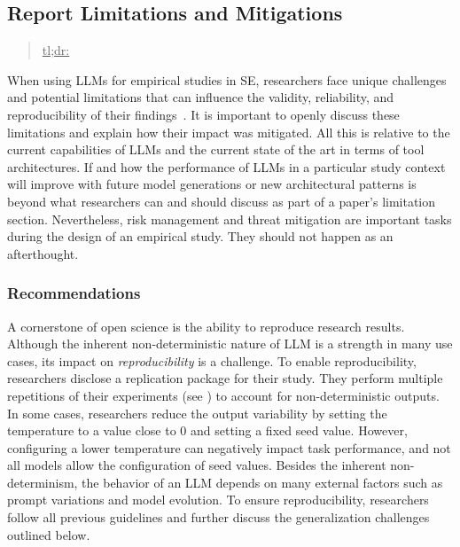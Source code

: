 



\subsection{Report Limitations and Mitigations}
\label{sec:report-limitations-and-mitigations}

\begin{quote}
\underline{tl;dr:} 
\end{quote}


When using LLMs for empirical studies in SE, researchers face unique challenges and potential limitations that can influence the validity, reliability, and reproducibility of their findings~\cite{sallou2024breaking}.
It is important to openly discuss these limitations and explain how their impact was mitigated.
All this is relative to the current capabilities of LLMs and the current state of the art in terms of tool architectures.
If and how the performance of LLMs in a particular study context will improve with future model generations or new architectural patterns is beyond what researchers can and should discuss as part of a paper's limitation section.
Nevertheless, risk management and threat mitigation are important tasks during the design of an empirical study.
They should not happen as an afterthought.

\subsubsection{Recommendations}

A cornerstone of open science is the ability to reproduce research results.
Although the inherent non-deterministic nature of LLM is a strength in many use cases, its impact on \emph{reproducibility} is a challenge.
To enable reproducibility, researchers \should disclose a replication package for their study.
They \should perform multiple repetitions of their experiments (see \benchmarksmetrics) to account for non-deterministic outputs.
In some cases, researchers \may reduce the output variability by setting the temperature to a value close to 0 and setting a fixed seed value.
However, configuring a lower temperature can negatively impact task performance, and not all models allow the configuration of seed values.
Besides the inherent non-determinism, the behavior of an LLM depends on many external factors such as prompt variations and model evolution.
To ensure reproducibility, researchers \should follow all previous guidelines and further discuss the generalization challenges outlined below.

